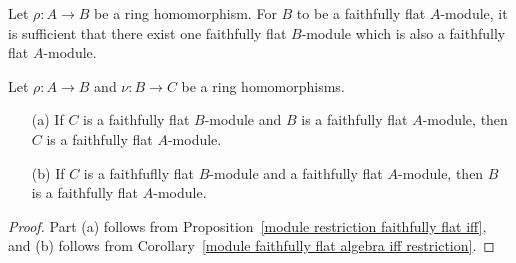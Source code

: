 \begin{corollary}\label{module faithfully flat algebra iff restriction}
Let $\rho:A\to B$ be a ring homomorphism. For $B$ to be a faithfully flat $A$-module, it is sufficient that there exist one faithfully flat $B$-module which is also a faithfully flat $A$-module.
\end{corollary}
\begin{corollary}\label{module faithfully flat algebra transitivity}
Let $\rho:A\to B$ and $\nu:B\to C$ be a ring homomorphisms.
\begin{itemize}
\item[(a)] If $C$ is a faithfully flat $B$-module and $B$ is a faithfully flat $A$-module, then $C$ is a faithfully flat $A$-module.
\item[(b)] If $C$ is a faithfuflly flat $B$-module and a faithfully flat $A$-module, then $B$ is a faithfully flat $A$-module.
\end{itemize}
\end{corollary}
\begin{proof}
Part (a) follows from Proposition~\ref{module restriction faithfully flat iff}, and (b) follows from Corollary~\ref{module faithfully flat algebra iff restriction}.
\end{proof}
